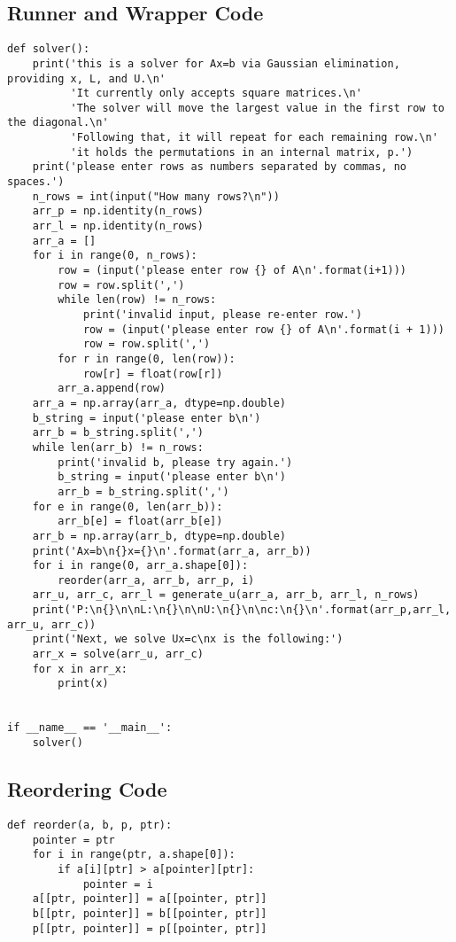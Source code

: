 \documentclass{article}
\begin{document}
\subsection{Runner and Wrapper Code}
\begin{verbatim}
def solver():
    print('this is a solver for Ax=b via Gaussian elimination, providing x, L, and U.\n'
          'It currently only accepts square matrices.\n'
          'The solver will move the largest value in the first row to the diagonal.\n'
          'Following that, it will repeat for each remaining row.\n'
          'it holds the permutations in an internal matrix, p.')
    print('please enter rows as numbers separated by commas, no spaces.')
    n_rows = int(input("How many rows?\n"))
    arr_p = np.identity(n_rows)
    arr_l = np.identity(n_rows)
    arr_a = []
    for i in range(0, n_rows):
        row = (input('please enter row {} of A\n'.format(i+1)))
        row = row.split(',')
        while len(row) != n_rows:
            print('invalid input, please re-enter row.')
            row = (input('please enter row {} of A\n'.format(i + 1)))
            row = row.split(',')
        for r in range(0, len(row)):
            row[r] = float(row[r])
        arr_a.append(row)
    arr_a = np.array(arr_a, dtype=np.double)
    b_string = input('please enter b\n')
    arr_b = b_string.split(',')
    while len(arr_b) != n_rows:
        print('invalid b, please try again.')
        b_string = input('please enter b\n')
        arr_b = b_string.split(',')
    for e in range(0, len(arr_b)):
        arr_b[e] = float(arr_b[e])
    arr_b = np.array(arr_b, dtype=np.double)
    print('Ax=b\n{}x={}\n'.format(arr_a, arr_b))
    for i in range(0, arr_a.shape[0]):
        reorder(arr_a, arr_b, arr_p, i)
    arr_u, arr_c, arr_l = generate_u(arr_a, arr_b, arr_l, n_rows)
    print('P:\n{}\n\nL:\n{}\n\nU:\n{}\n\nc:\n{}\n'.format(arr_p,arr_l, arr_u, arr_c))
    print('Next, we solve Ux=c\nx is the following:')
    arr_x = solve(arr_u, arr_c)
    for x in arr_x:
        print(x)


if __name__ == '__main__':
    solver()
\end{verbatim}
\subsection{Reordering Code}
\label{reorder}
\begin{verbatim}
def reorder(a, b, p, ptr):
    pointer = ptr
    for i in range(ptr, a.shape[0]):
        if a[i][ptr] > a[pointer][ptr]:
            pointer = i
    a[[ptr, pointer]] = a[[pointer, ptr]]
    b[[ptr, pointer]] = b[[pointer, ptr]]
    p[[ptr, pointer]] = p[[pointer, ptr]]
\end{verbatim}
\end{document}
